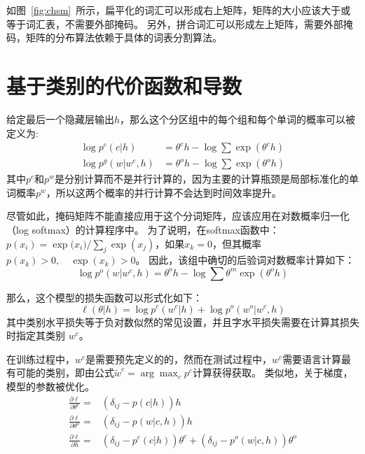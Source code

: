 如图~\ref{fig:chsm}~所示，扁平化的词汇可以形成右上矩阵，矩阵的大小应该大于或等于词汇表，不需要外部掩码。
另外，拼合词汇可以形成左上矩阵，需要外部掩码，矩阵的分布算法依赖于具体的词表分割算法。

\section{基于类别的代价函数和导数}
给定最后一个隐藏层输出$ h $，那么这个分区组中的每个组和每个单词的概率可以被定义为:
\begin{equation}
\begin{split}
\log p^c(c|h) &= \theta^c h-\log \sum{\exp( \theta^c h )} \\
\log p^g(w|w^c,h)&=\theta^o h -\log\sum\exp{(\theta^o h)}
\end{split}
\end{equation}
其中$ p ^ c $和$ p ^ w $是分别计算而不是并行计算的，因为主要的计算瓶颈是局部标准化的单词概率$ p ^ w $，所以这两个概率的并行计算不会达到时间效率提升。


尽管如此，掩码矩阵不能直接应用于这个分词矩阵，应该应用在对数概率归一化（log softmax）的计算程序中。 为了说明，在softmax函数中：$ p(x_i)= {\exp({x_i}})/ {\sum_j \exp(x_j)} $，如果$ x_k = 0 $，但其概率$ p(x_k)> 0,\quad \exp(x_k)> 0 $。 因此，该组中确切的后验词对数概率计算如下：
\begin{equation}
  \log p^o(w|w^c,h)=\theta^o h -\log\sum\theta^m\exp(\theta^o h)
\end{equation}

那么，这个模型的损失函数可以形式化如下：
\begin{equation}
\ell(\theta|h) =\log p^c(w^c|h) +\log p^o(w^o|w^c,h)
\end{equation}
其中类别水平损失等于负对数似然的常见设置，并且字水平损失需要在计算其损失时指定其类别 $ w ^ c $。

在训练过程中，$ w ^ c $是需要预先定义的的，然而在测试过程中，$w^c$需要语言计算最有可能的类别，即由公式$\tilde w^c=\arg\max_c p^c$计算获得获取。 类似地，关于梯度，模型的参数被优化。
\begin{equation}
\begin{split}
\frac{\partial \ell}{\partial \theta^c}=& (\delta_{ij}-p(c|h))h \\
\frac{\partial \ell}{\partial \theta^o}=&(\delta_{ij}-p(w|c,h))h \\
\frac{\partial \ell}{\partial h}=&(\delta_{ij}-p^c(c|h))\theta^c + (\delta_{ij}-p^o(w|c,h))\theta^o
\end{split}
\end{equation}

